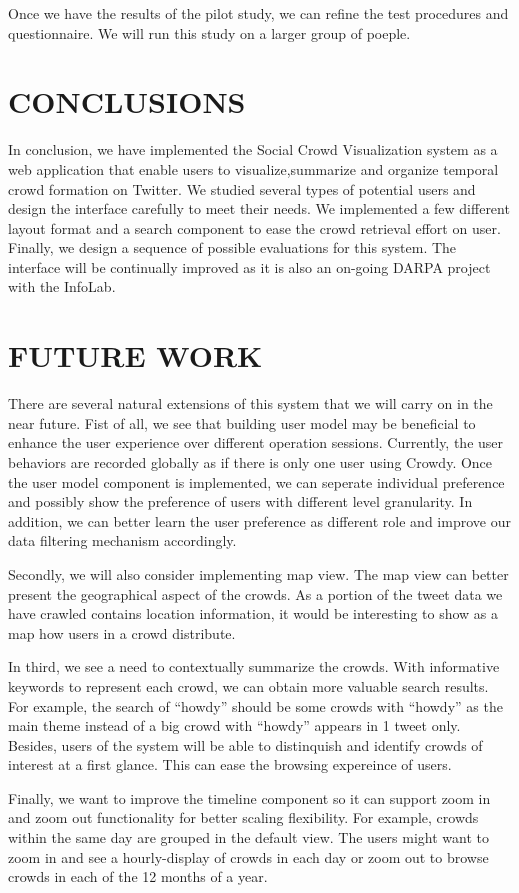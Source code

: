 \documentclass{sig-alternate}
\begin{document}
Once we have the results of the pilot study, we can refine the test procedures
and questionnaire. We will run this study on a larger group of poeple.

\section{CONCLUSIONS}
In conclusion, we have implemented the Social Crowd Visualization system as a
web application that enable users to visualize,summarize and organize temporal
crowd formation on Twitter. We studied several types of potential users and
design the interface carefully to meet their needs. We implemented a few
different layout format and a search component to ease the crowd retrieval
effort on user. Finally, we design a sequence of possible evaluations for this
system. The interface will be continually improved as it is also an on-going
DARPA project with the InfoLab. 

\section{FUTURE WORK}
There are several natural extensions of this system that we will carry on in the near future. Fist of all, we see that building user model may be beneficial to enhance the user experience over different operation sessions. Currently, the user behaviors are recorded globally as if there is only one user using Crowdy. Once the user model component is implemented, we can seperate individual preference and possibly show the preference of users with different level granularity. In addition, we can better learn the user preference as different role and improve our data filtering mechanism accordingly.  

Secondly, we will also consider implementing map view. The map view can better present the geographical aspect of the crowds. As a portion of the tweet data we have crawled contains location information, it would be interesting to show as a map how users in a crowd distribute.

In third, we see a need to contextually summarize the crowds. With informative keywords to represent each crowd, we can obtain more valuable search results. For example, the search of ``howdy'' should be some crowds with ``howdy'' as the main theme instead of a big crowd with ``howdy'' appears in 1 tweet only. Besides, users of the system will be able to distinquish and identify crowds of interest at a first glance. This can ease the browsing expereince of users.

Finally, we want to improve the timeline component so it can support zoom in and zoom out functionality for better scaling flexibility. For example, crowds within the same day are grouped in the default view. The users might want to zoom in and see a hourly-display of crowds in each day or zoom out to browse crowds in each of the 12 months of a year.


 
\end{document}

